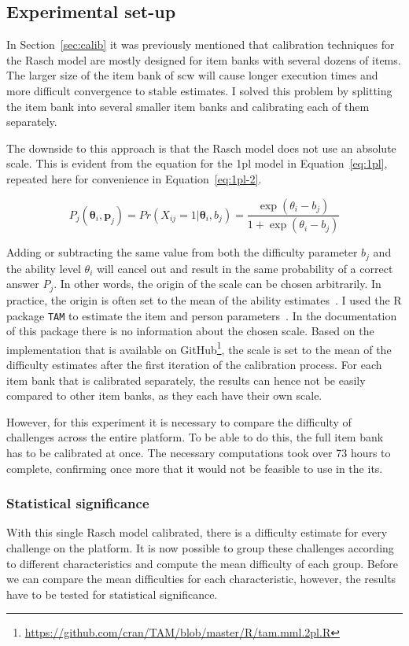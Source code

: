 \subsection{Experimental set-up}
In Section~\ref{sec:calib} it was previously mentioned that calibration techniques for the Rasch model are mostly designed for item banks with several dozens of items.
The larger size of the item bank of \gls{scw} will cause longer execution times and more difficult convergence to stable estimates.
I solved this problem by splitting the item bank into several smaller item banks and calibrating each of them separately.

The downside to this approach is that the Rasch model does not use an absolute scale.
This is evident from the equation for the \gls{1pl} model in Equation~\ref{eq:1pl}, repeated here for convenience in Equation~\ref{eq:1pl-2}.

\begin{equation}
    \label{eq:1pl-2}
    P_{j}(\bm{\theta}_i,\bm{p}_j) =
    Pr(X_{ij} = 1 | \bm{\theta}_i,b_j) =
    \frac{\exp(\theta_i - b_j)}{1 + \exp(\theta_i - b_j)}
\end{equation}

Adding or subtracting the same value from both the difficulty parameter $b_j$ and the ability level $\theta_i$ will cancel out and result in the same probability of a correct answer $P_j$.
In other words, the origin of the scale can be chosen arbitrarily.
In practice, the origin is often set to the mean of the ability estimates~\cite{magis2017computerized}.
I used the R package \texttt{TAM} to estimate the item and person parameters~\cite{robitzsch2021package}.
In the documentation of this package there is no information about the chosen scale.
Based on the implementation that is available on GitHub\footnote{\url{https://github.com/cran/TAM/blob/master/R/tam.mml.2pl.R}}, the scale is set to the mean of the difficulty estimates after the first iteration of the calibration process.
For each item bank that is calibrated separately, the results can hence not be easily compared to other item banks, as they each have their own scale.

However, for this experiment it is necessary to compare the difficulty of challenges across the entire platform.
To be able to do this, the full item bank has to be calibrated at once. 
The necessary computations took over 73 hours to complete, confirming once more that it would not be feasible to use in the \gls{its}.

\subsubsection{Statistical significance}
With this single Rasch model calibrated, there is a difficulty estimate for every challenge on the platform.
It is now possible to group these challenges according to different characteristics and compute the mean difficulty of each group.
Before we can compare the mean difficulties for each characteristic, however, the results have to be tested for statistical significance.

